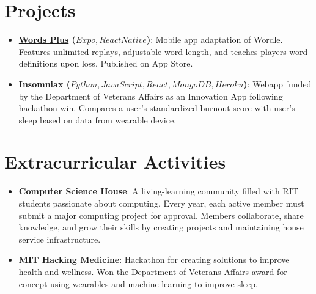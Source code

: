 \documentclass[a4paper,20pt]{article}
\newcommand{\resumeItem}[2]{
  \item\small{
    \textbf{#1}{: #2 \vspace{-2pt}}
  }
}
\newcommand{\resumeSubItem}[2]{\resumeItem{#1}{#2}\vspace{-3pt}}
\newcommand{\resumeSubHeadingListStart}{\begin{itemize}[leftmargin=*]}
\newcommand{\resumeSubHeadingListEnd}{\end{itemize}}
\begin{document}
\section{Projects}
\resumeSubHeadingListStart
\resumeSubItem{\href{https://apps.apple.com/us/app/words-puzzle/id1606643323}{Words Plus} (\(Expo, React Native\))}{Mobile app adaptation of Wordle. Features unlimited replays, adjustable word length, and teaches players word definitions upon loss. Published on App Store.}
\vspace{2pt}
\resumeSubItem{Insomniax (\(Python, JavaScript, React, MongoDB, Heroku\))}{Webapp funded by the Department of Veterans Affairs as an Innovation App following hackathon win. Compares a user's standardized burnout score with user's sleep based on data from wearable device.}
\vspace{2pt}
\resumeSubHeadingListEnd
\vspace{-5pt}
\vspace{-5pt}

\section{Extracurricular Activities}
  \resumeSubHeadingListStart
        \resumeSubItem{Computer Science House}{A living-learning community filled with RIT students passionate about computing. Every year, each active member
must submit a major computing project for approval. Members collaborate, share knowledge, and grow
their skills by creating projects and maintaining house service infrastructure.
}
        \vspace{2pt}
        \vspace{5pt}
        \resumeSubItem{MIT Hacking Medicine}{Hackathon for creating solutions to improve health and wellness. Won the Department of Veterans Affairs award for concept using wearables and machine learning to
improve sleep.}
\resumeSubHeadingListEnd
\end{document}
